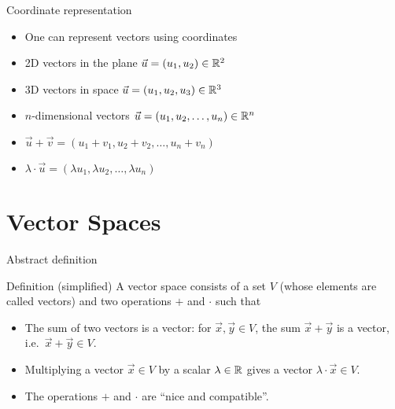 \documentclass{beamer}
\begin{document}
\begin{frame}[t]{Coordinate representation}
	\begin{itemize}
		\item One can represent vectors using coordinates
		\item 2D vectors in the plane $\vec{u} = (u_1,u_2) \in \mathbb{R}^2$
		\item 3D vectors in space $\vec{u} = (u_1,u_2,u_3) \in \mathbb{R}^3$
		\item $n$-dimensional vectors  $\vec{u} = (u_1,u_2,\dots, u_n) \in \mathbb{R}^n$
	\end{itemize}
	\vspace{3.5cm}
	\begin{itemize}
		\item $\vec{u} + \vec{v} = (u_1 + v_1,u_2 + v_2,\dots, u_n + v_n)$
		\item $\lambda \cdot \vec{u}= (\lambda u_1,\lambda u_2,\dots, \lambda u_n)$
	\end{itemize}
\end{frame}




\section{Vector Spaces}

\begin{frame}{Abstract definition}
	\begin{block}{Definition (simplified)}
		A vector space consists of a set $V$ (whose elements are called vectors) and two operations $+$ and $\cdot$ such that
		\begin{itemize}
			\item The sum of two vectors is a vector: for $\vec{x}, \vec{y} \in V$, the sum $\vec{x}+\vec{y}$ is a vector, i.e.\ $\vec{x} + \vec{y} \in V$.
			\item Multiplying a vector $\vec{x} \in V$ by a scalar $\lambda \in \mathbb{R}$ gives a vector $\lambda \cdot \vec{x} \in V$.
			\item The operations $+$ and $\cdot$ are ``nice and compatible''.
		\end{itemize}
	\end{block}
\end{frame}
\end{document}
